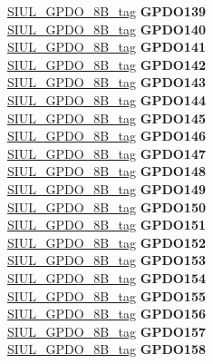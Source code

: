 \begin{DoxyCompactItemize}
\begin{tabbing}
\>\>\mbox{\hyperlink{unionSIUL__GPDO__8B__tag}{SIUL\_GPDO\_8B\_tag}} {\bfseries GPDO139}\\
\>\>\mbox{\hyperlink{unionSIUL__GPDO__8B__tag}{SIUL\_GPDO\_8B\_tag}} {\bfseries GPDO140}\\
\>\>\mbox{\hyperlink{unionSIUL__GPDO__8B__tag}{SIUL\_GPDO\_8B\_tag}} {\bfseries GPDO141}\\
\>\>\mbox{\hyperlink{unionSIUL__GPDO__8B__tag}{SIUL\_GPDO\_8B\_tag}} {\bfseries GPDO142}\\
\>\>\mbox{\hyperlink{unionSIUL__GPDO__8B__tag}{SIUL\_GPDO\_8B\_tag}} {\bfseries GPDO143}\\
\>\>\mbox{\hyperlink{unionSIUL__GPDO__8B__tag}{SIUL\_GPDO\_8B\_tag}} {\bfseries GPDO144}\\
\>\>\mbox{\hyperlink{unionSIUL__GPDO__8B__tag}{SIUL\_GPDO\_8B\_tag}} {\bfseries GPDO145}\\
\>\>\mbox{\hyperlink{unionSIUL__GPDO__8B__tag}{SIUL\_GPDO\_8B\_tag}} {\bfseries GPDO146}\\
\>\>\mbox{\hyperlink{unionSIUL__GPDO__8B__tag}{SIUL\_GPDO\_8B\_tag}} {\bfseries GPDO147}\\
\>\>\mbox{\hyperlink{unionSIUL__GPDO__8B__tag}{SIUL\_GPDO\_8B\_tag}} {\bfseries GPDO148}\\
\>\>\mbox{\hyperlink{unionSIUL__GPDO__8B__tag}{SIUL\_GPDO\_8B\_tag}} {\bfseries GPDO149}\\
\>\>\mbox{\hyperlink{unionSIUL__GPDO__8B__tag}{SIUL\_GPDO\_8B\_tag}} {\bfseries GPDO150}\\
\>\>\mbox{\hyperlink{unionSIUL__GPDO__8B__tag}{SIUL\_GPDO\_8B\_tag}} {\bfseries GPDO151}\\
\>\>\mbox{\hyperlink{unionSIUL__GPDO__8B__tag}{SIUL\_GPDO\_8B\_tag}} {\bfseries GPDO152}\\
\>\>\mbox{\hyperlink{unionSIUL__GPDO__8B__tag}{SIUL\_GPDO\_8B\_tag}} {\bfseries GPDO153}\\
\>\>\mbox{\hyperlink{unionSIUL__GPDO__8B__tag}{SIUL\_GPDO\_8B\_tag}} {\bfseries GPDO154}\\
\>\>\mbox{\hyperlink{unionSIUL__GPDO__8B__tag}{SIUL\_GPDO\_8B\_tag}} {\bfseries GPDO155}\\
\>\>\mbox{\hyperlink{unionSIUL__GPDO__8B__tag}{SIUL\_GPDO\_8B\_tag}} {\bfseries GPDO156}\\
\>\>\mbox{\hyperlink{unionSIUL__GPDO__8B__tag}{SIUL\_GPDO\_8B\_tag}} {\bfseries GPDO157}\\
\>\>\mbox{\hyperlink{unionSIUL__GPDO__8B__tag}{SIUL\_GPDO\_8B\_tag}} {\bfseries GPDO158}\\

\end{tabbing}
\end{DoxyCompactItemize}
